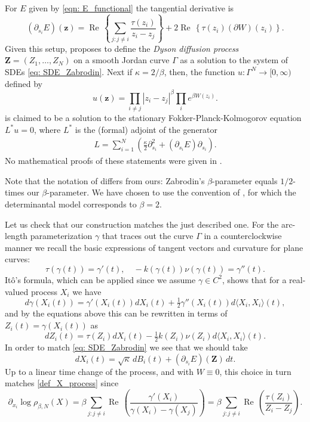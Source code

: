\documentclass[11pt]{article}
\renewcommand{\Re}{\operatorname{Re}\,}
\numberwithin{equation}{section}
\theoremstyle{definition}
\begin{document}
For $E$ given by \eqref{eqn: E_functional} the tangential derivative is 
\[
(\partial_{s_i} E)(\boldsymbol{z}) = \Re \left\{ \sum_{j:j \neq i} \frac{\tau(z_i)}{z_i - z_j} \right\} + 2 \Re \left\{\tau(z_i) (\partial W)(z_i) \right\}.
\]
Given this setup, \cite{zabrodin2023dyson} proposes to define the \emph{Dyson diffusion process} $\boldsymbol{Z} = (Z_1, \ldots, Z_N)$ on a smooth Jordan curve $\Gamma$ as a solution to the system of SDEs \eqref{eq: SDE_Zabrodin}. Next if $\kappa = 2/\beta$, then, the function $u : \Gamma^N \to [0, \infty)$ defined by
\[
u(\boldsymbol{z}) = \prod_{i \neq j} |z_i - z_j|^{\beta} \prod_{i} e^{\beta W(z_i)}.
\]
is claimed to be a solution to the stationary Fokker-Planck-Kolmogorov equation $L^*u = 0$, where $L^*$ is the (formal) adjoint of the generator
\begin{align*}
    L = \sum\limits_{i=1}^{N}\left(\frac{\kappa}{2}\partial_{s_{i}}^{2} + (\partial_{s_{i}}E)\partial_{s_{i}}\right).
\end{align*}
No mathematical proofs of these statements were given in \cite{zabrodin2023dyson}.

Note that the notation of \cite{zabrodin2023dyson} differs from ours: Zabrodin's $\beta$-parameter equals $1/2$-times our $\beta$-parameter. We have chosen to use the convention of \cite{johansson2023coulomb, courteaut2025planar}, for which the determinantal model corresponds to $\beta = 2$.

Let us check that our construction matches the just described one. For the arc-length parameterization $\gamma$ that traces out the curve $\Gamma$ in a counterclockwise manner we recall the basic expressions of tangent vectors and curvature for plane curves: 
\[
\tau(\gamma(t)) = \gamma'(t), \quad -k(\gamma(t)) \nu(\gamma(t)) = \gamma''(t). 
\]
Itô's formula, which can be applied since we assume $\gamma \in C^2$, shows that for a real-valued process $X_i$ we have
\[
d \gamma(X_i(t)) = \gamma'(X_i(t)) dX_i(t) + \tfrac{1}{2} \gamma''(X_i(t)) d \langle X_i, X_i \rangle(t),
\]
and by the equations above this can be rewritten in terms of $Z_i(t) = \gamma(X_i(t))$ as
\[
d Z_i(t) = \tau(Z_i)  dX_i(t) - \tfrac{1}{2} k(Z_i) \nu(Z_i) d \langle X_i, X_i \rangle(t). 
\]
In order to match \eqref{eq: SDE_Zabrodin} we see that we should take
\[
dX_i(t) = \sqrt{\kappa} \, dB_i(t) + (\partial_{s_i} E)(\boldsymbol{Z}) \, dt.
\]
Up to a linear time change of the process, and with $W \equiv 0$, this choice in turn matches \eqref{def_X_process} since
\[
\partial_{x_i} \log \rho_{\beta,N}(X) = \beta \sum_{j : j \neq i} \Re \left( \frac{\gamma'(X_i)}{\gamma(X_i) - \gamma(X_j)} \right) = \beta \sum_{j : j \neq i} \Re \left( \frac{\tau(Z_i)}{Z_i - Z_j} \right).
\]
\end{document}
